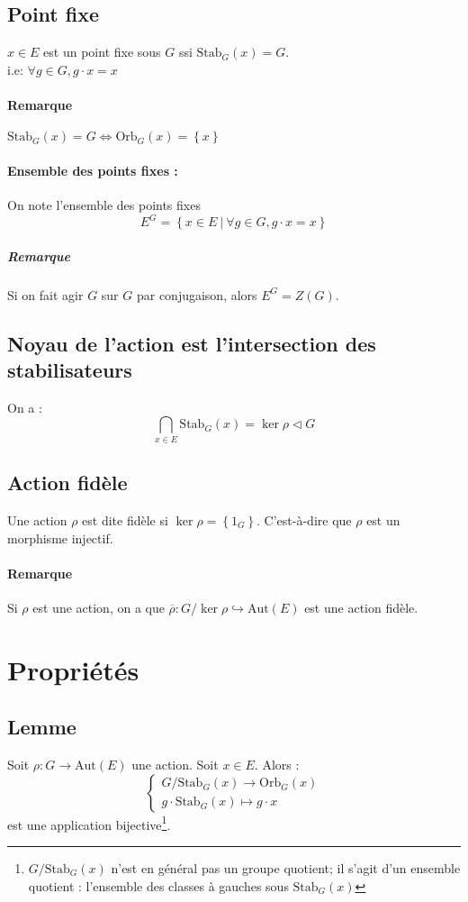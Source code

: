 \documentclass[a4paper,10pt]{report}
\newcommand{\set}[1]{\left\lbrace #1 \right\rbrace } %
\newcommand{\inj}{\hookrightarrow}
\newcommand{\mfootnote}[1]{\up{(}\footnote{#1}\up{)}}
\newcommand{\Aut}[1]{\text{Aut}\left(#1\right)}
\newcommand{\Orb}[2]{\text{Orb}_{#1}\left( #2 \right)}
\newcommand{\Stab}[2]{\text{Stab}_{#1}\left( #2 \right)}
\newcommand{\such}{\ \Big| \ }
\begin{document}
   \subsection{Point fixe} 
    $x \in E$ est un point fixe sous $G$ ssi $\Stab{G}{x}=G$.\\
    i.e: $\forall g \in G, g\cdot x = x$
 
    \paragraph{Remarque} $\Stab{G}{x}=G \iff \Orb{G}{x}=\set{x}$
 
    \paragraph{Ensemble des points fixes :} On note l'ensemble des points fixes
    $$E^G = \set{x \in E \such \forall g \in G, g\cdot x = x}$$
     \subparagraph{Remarque} Si on fait agir $G$ sur $G$ par conjugaison, alors
     $E^G=Z(G)$.
   \subsection{Noyau de l'action est l'intersection des stabilisateurs}
    On a :
    $$\bigcap_{x \in E}\Stab{G}{x}=\ker \rho \triangleleft G$$
 
   \subsection{Action fidèle}
    Une action $\rho$ est dite fidèle si $\ker \rho = \set{1_G}$. C'est-à-dire
    que $\rho$ est un morphisme injectif.
 
    \paragraph{Remarque} Si $\rho$ est une action, on a que
    $\overline{\rho} : G/\ker \rho \inj \Aut{E}$ est une action fidèle.

  \section{Propriétés}
   \subsection{Lemme \label{lemme:actioniso}}
    Soit $\rho: G \to \Aut{E}$ une action. Soit $x\in E$. Alors :
    $$
    \begin{cases}
      G/\Stab{G}{x} \to \Orb{G}{x}\\
      g \cdot\Stab{G}{x} \mapsto g \cdot x
    \end{cases}$$
    est une application bijective\mfootnote{$G/\Stab{G}{x}$ n'est en général pas
    un groupe quotient; il s'agit d'un ensemble quotient : l'ensemble des
    classes à gauches sous $\Stab{G}{x}$}.
    \begin{comment}
      \mfootnote{Preuve : 03/12/08 p1 verso}
    \end{comment}
\end{document}
